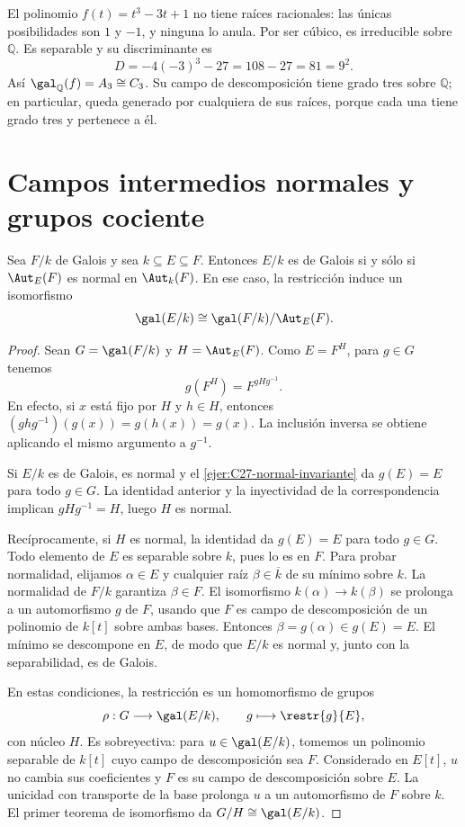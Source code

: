 \begin{ejem}
El polinomio $f(t)=t^3-3t+1$ no tiene raíces racionales: las únicas posibilidades son $1$ y $-1$, y ninguna lo anula. Por ser cúbico, es irreducible sobre $\mathbb Q$. Es separable y su discriminante es
\[
D=-4(-3)^3-27=108-27=81=9^2.
\]
Así $\gal_{\mathbb Q}(f)=A_3\cong C_3$. Su campo de descomposición tiene grado tres sobre $\mathbb Q$; en particular, queda generado por cualquiera de sus raíces, porque cada una tiene grado tres y pertenece a él.
\end{ejem}

\section{Campos intermedios normales y grupos cociente}
\begin{teo}\label{teo:C27-cociente}
Sea $F/k$ de Galois y sea $k\subseteq E\subseteq F$. Entonces $E/k$ es de Galois si y sólo si $\Aut_E(F)$ es normal en $\Aut_k(F)$. En ese caso, la restricción induce un isomorfismo
\[
\gal(E/k)\cong\gal(F/k)/\Aut_E(F).
\]
\end{teo}
\begin{proof}
Sean $G=\gal(F/k)$ y $H=\Aut_E(F)$. Como $E=F^H$, para $g\in G$ tenemos
\[
g(F^H)=F^{gHg^{-1}}.
\]
En efecto, si $x$ está fijo por $H$ y $h\in H$, entonces $(ghg^{-1})(g(x))=g(h(x))=g(x)$. La inclusión inversa se obtiene aplicando el mismo argumento a $g^{-1}$.

Si $E/k$ es de Galois, es normal y el \cref{ejer:C27-normal-invariante} da $g(E)=E$ para todo $g\in G$. La identidad anterior y la inyectividad de la correspondencia implican $gHg^{-1}=H$, luego $H$ es normal.

Recíprocamente, si $H$ es normal, la identidad da $g(E)=E$ para todo $g\in G$. Todo elemento de $E$ es separable sobre $k$, pues lo es en $F$. Para probar normalidad, elijamos $\alpha\in E$ y cualquier raíz $\beta\in\overline k$ de su mínimo sobre $k$. La normalidad de $F/k$ garantiza $\beta\in F$. El isomorfismo $k(\alpha)\to k(\beta)$ se prolonga a un automorfismo $g$ de $F$, usando que $F$ es campo de descomposición de un polinomio de $k[t]$ sobre ambas bases. Entonces $\beta=g(\alpha)\in g(E)=E$. El mínimo se descompone en $E$, de modo que $E/k$ es normal y, junto con la separabilidad, es de Galois.

En estas condiciones, la restricción es un homomorfismo de grupos
\[
\rho:G\longrightarrow\gal(E/k),\qquad g\longmapsto\restr{g}{E},
\]
con núcleo $H$. Es sobreyectiva: para $u\in\gal(E/k)$, tomemos un polinomio separable de $k[t]$ cuyo campo de descomposición sea $F$. Considerado en $E[t]$, $u$ no cambia sus coeficientes y $F$ es su campo de descomposición sobre $E$. La unicidad con transporte de la base prolonga $u$ a un automorfismo de $F$ sobre $k$. El primer teorema de isomorfismo da $G/H\cong\gal(E/k)$.
\end{proof}

